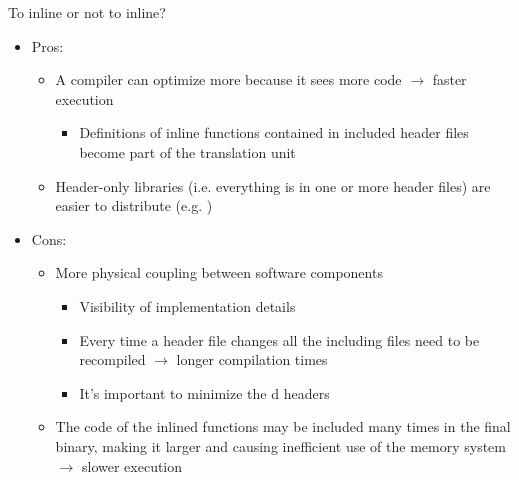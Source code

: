 \begin{frame}{To inline or not to inline?}

  \begin{itemize}[<+->]
  \item Pros:
    \begin{itemize}[<.->]
    \item A compiler can optimize more because it sees more code $\rightarrow$
      faster execution
      \begin{itemize}[<.->]
      \item Definitions of inline functions contained in included header files
        become part of the translation unit
      \end{itemize}
    \item Header-only libraries (i.e. everything is in one or more header files)
      are easier to distribute (e.g. )
    \end{itemize}
  \item Cons:
    \begin{itemize}[<.->]
    \item More physical coupling between software components
      \begin{itemize}[<.->]
      \item Visibility of implementation details
      \item Every time a header file changes all the including files need to be
        recompiled $\rightarrow$ longer compilation times
      \item It's important to minimize the d headers
      \end{itemize}
    \item The code of the inlined functions may be included many times in the
      final binary, making it larger and causing inefficient use of the memory
      system $\rightarrow$ slower execution
    \end{itemize}
  \end{itemize}

\end{frame}

